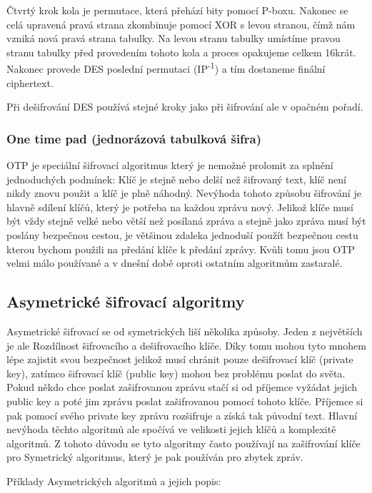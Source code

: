 \documentclass[12pt,a4paper]{report}
\begin{document}
Čtvrtý krok kola je permutace, která přehází bity pomocí P-boxu. Nakonec se celá upravená pravá strana zkombinuje pomocí XOR s levou stranou, čímž nám vzniká nová pravá strana tabulky. Na levou stranu tabulky umístíme pravou stranu tabulky před provedením tohoto kola a proces opakujeme celkem 16krát. Nakonec provede DES poslední permutaci (IP\textsuperscript{-1}) a tím dostaneme finální ciphertext.

Při dešifrování DES používá stejné kroky jako při šifrování ale v opačném pořadí. 

\subsubsection{One time pad (jednorázová tabulková šifra)}
OTP je speciální šifrovací algoritmus který je nemožné prolomit za splnění jednoduchých podmínek: Klíč je stejně nebo delší než šifrovaný text, klíč není nikdy znovu použit a klíč je plně náhodný. Nevýhoda tohoto způsobu šifrování je hlavně sdílení klíčů, který je potřeba na každou zprávu nový. Jelikož klíče musí být vždy stejně velké nebo větší než posílaná zpráva a stejně jako zpráva musí být poslány bezpečnou cestou, je většinou zdaleka jednoduší použít bezpečnou cestu kterou bychom použili na předání klíče k předání zprávy. Kvůli tomu jsou OTP velmi málo používané a v dnešní době oproti ostatním algoritmům zastaralé.



\subsection{Asymetrické šifrovací algoritmy}
Asymetrické šifrovací se od symetrických liší několika způsoby. Jeden z největších je ale Rozdílnost šifrovacího a dešifrovacího klíče. Díky tomu mohou tyto mnohem lépe zajistit svou bezpečnost jelikož musí chránit pouze dešifrovací klíč (private key), zatímco šifrovací klíč (public key) mohou bez problému poslat do světa. Pokud někdo chce poslat zašifrovanou zprávu stačí si od příjemce vyžádat jejich public key a poté jim zprávu poslat zašifrovanou pomocí tohoto klíče. Příjemce si pak pomocí svého private key zprávu rozšifruje a získá tak původní text. Hlavní nevýhoda těchto algoritmů ale spočívá ve velikosti jejich klíčů a komplexitě algoritmů. Z tohoto důvodu se tyto algoritmy často používají na zašifrování klíče pro Symetrický algoritmus, který je pak používán pro zbytek zpráv. 

Příklady Asymetrických algoritmů a jejich popis:
\end{document}
